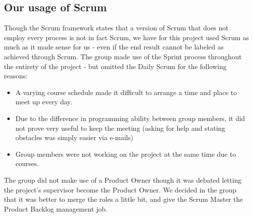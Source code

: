 \subsection{Our usage of Scrum}


Though the Scrum framework states that a version of Scrum that does not employ every process is not in fact Scrum, we have for this project used Scrum as much as it made sense for us - even if the end result cannot be labeled as achieved through Scrum\cite{scrumguide11}. The group made use of the Sprint process throughout the entirety of the project - but omitted the Daily Scrum for the following reasons:

\begin{itemize}
	\item A varying course schedule made it difficult to arrange a time and place to meet up every day.
	\item Due to the difference in programming ability between group members, it did not prove very useful to keep the meeting (asking for help and stating obstacles was simply easier via e-mails)
	\item Group members were not working on the project at the same time due to courses.
\end{itemize}

The group did not make use of a Product Owner though it was debated letting the project's supervisor become the Product Owner. We decided in the group that it was better to merge the roles a little bit, and give the Scrum Master the Product Backlog management job.